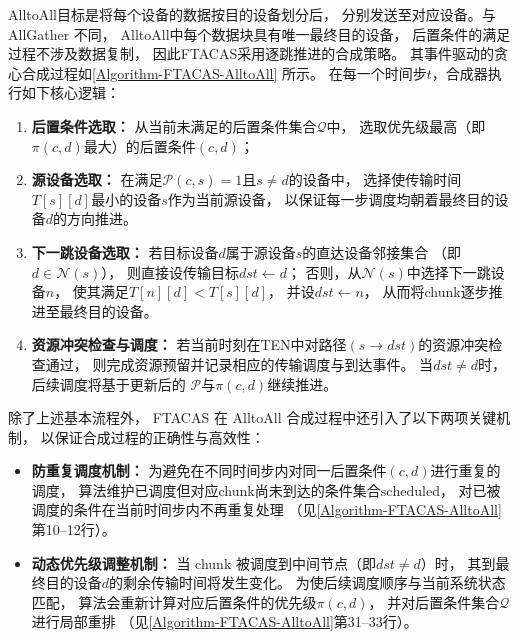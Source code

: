 AlltoAll目标是将每个设备的数据按目的设备划分后，
分别发送至对应设备。与 AllGather 不同，
AlltoAll中每个数据块具有唯一最终目的设备，
后置条件的满足过程不涉及数据复制，
因此FTACAS采用逐跳推进的合成策略。
其事件驱动的贪心合成过程如\autoref{Algorithm-FTACAS-AlltoAll} 所示。
在每一个时间步$t$，合成器执行如下核心逻辑：
\begin{enumerate}[label=(\arabic*)]
    \item \textbf{后置条件选取：}  
    从当前未满足的后置条件集合$\mathcal{Q}$中，
    选取优先级最高（即$\pi(c,d)$最大）的后置条件$(c,d)$；

    \item \textbf{源设备选取：}  
    在满足$\mathcal{P}(c,s)=1$且$s\neq d$的设备中，
    选择使传输时间$T[s][d]$最小的设备$s$作为当前源设备，
    以保证每一步调度均朝着最终目的设备$d$的方向推进。

    \item \textbf{下一跳设备选取：}  
    若目标设备$d$属于源设备$s$的直达设备邻接集合
    （即$d\in\mathcal{N}(s)$），
    则直接设传输目标$dst\leftarrow d$；
    否则，从$\mathcal{N}(s)$中选择下一跳设备$n$，
    使其满足$T[n][d]<T[s][d]$，
    并设$dst\leftarrow n$，
    从而将chunk逐步推进至最终目的设备。

    \item \textbf{资源冲突检查与调度：}  
    若当前时刻在TEN中对路径$(s\rightarrow dst)$的资源冲突检查通过，
    则完成资源预留并记录相应的传输调度与到达事件。
    当$dst\neq d$时，后续调度将基于更新后的
    $\mathcal{P}$与$\pi(c,d)$继续推进。
\end{enumerate}



除了上述基本流程外，
FTACAS 在 AlltoAll 合成过程中还引入了以下两项关键机制，
以保证合成过程的正确性与高效性：

\begin{itemize}
    \item \textbf{防重复调度机制：}
    为避免在不同时间步内对同一后置条件$(c,d)$进行重复的调度，
    算法维护已调度但对应chunk尚未到达的条件集合$\mathrm{scheduled}$，
    对已被调度的条件在当前时间步内不再重复处理
    （见\autoref{Algorithm-FTACAS-AlltoAll}第10--12行）。

    \item \textbf{动态优先级调整机制：}
    当 chunk 被调度到中间节点（即$dst\neq d$）时，
    其到最终目的设备$d$的剩余传输时间将发生变化。
    为使后续调度顺序与当前系统状态匹配，
    算法会重新计算对应后置条件的优先级$\pi(c,d)$，
    并对后置条件集合$\mathcal{Q}$进行局部重排
    （见\autoref{Algorithm-FTACAS-AlltoAll}第31--33行）。
\end{itemize}



